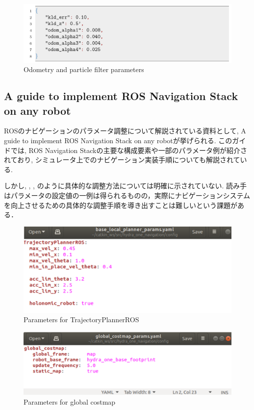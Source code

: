 \begin{figure}[hbtp]
  \centering
 \includegraphics[keepaspectratio, scale=0.3]
      {images/senkou_2.png}
 \caption{Odometry and particle filter parameters}
 \label{Fig:odometry and particle filter parameters}
\end{figure}


\subsection{A guide to implement ROS Navigation Stack on any robot}
ROSのナビゲーションのパラメータ調整について解説されている資料として, A guide to implement ROS Navigation Stack on any robot\cite{siryo_3}が挙げられる. 
このガイドでは, ROS Navigation Stackの主要な構成要素や一部のパラメータ例が紹介されており, シミュレータ上でのナビゲーション実装手順についても解説されている. 

しかし, , , のように具体的な調整方法については明確に示されていない. 
読み手はパラメータの設定値の一例は得られるものの，実際にナビゲーションシステムを向上させるための具体的な調整手順を導き出すことは難しいという課題がある．
\begin{figure}[hbtp]
  \centering
 \includegraphics[keepaspectratio, scale=0.17]
      {images/param_example_1.png}
 \caption{Parameters for TrajectoryPlannerROS}
 \label{Fig:param_example_1}
\end{figure}

\begin{figure}[hbtp]
  \centering
 \includegraphics[keepaspectratio, scale=0.17]
      {images/param_example_2.png}
 \caption{Parameters for global costmap}
 \label{Fig:param_example_2}
\end{figure}

